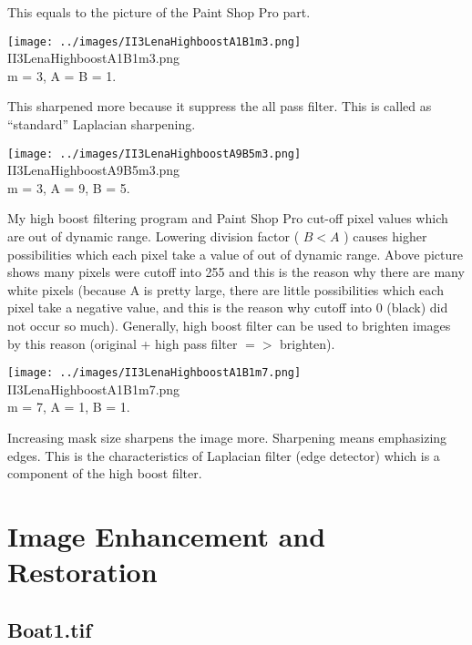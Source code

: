 \documentclass[article,oneside]{memoir}
\begin{document}
\begin{highboostfilter2.m}
This equals to the picture of the Paint Shop Pro part. 

\begin{center}
\texttt{[image: ../images/II3LenaHighboostA1B1m3.png]}\\
II3LenaHighboostA1B1m3.png\\
m = 3, A = B = 1.
\end{center}

This sharpened more because it suppress the all pass filter. This is called as "`standard"' Laplacian sharpening. 

\begin{center}
\texttt{[image: ../images/II3LenaHighboostA9B5m3.png]}\\
II3LenaHighboostA9B5m3.png\\
m = 3, A = 9, B = 5.
\end{center}

My high boost filtering program and Paint Shop Pro cut-off pixel values which are out of dynamic range. 
Lowering division factor ( $ B < A $ ) causes higher possibilities which each pixel take a value of out of dynamic range. Above picture shows many pixels were cutoff into 255 and this is the reason why there are many white pixels (because A is pretty large, there are little possibilities which each pixel take a negative value, and this is the reason why cutoff into 0 (black) did not occur so much). Generally, high boost filter can be used to brighten images by this reason (original + high pass filter $ => $ brighten). 
 
\begin{center}
\texttt{[image: ../images/II3LenaHighboostA1B1m7.png]}\\
II3LenaHighboostA1B1m7.png\\
m = 7, A = 1, B = 1.
\end{center}

Increasing mask size sharpens the image more. Sharpening means emphasizing edges. This is the characteristics of Laplacian filter (edge detector) which is a component of the high boost filter. 

\chapter{Image Enhancement and Restoration}

\section{Boat1.tif}


\end{highboostfilter2.m}
\end{document}

